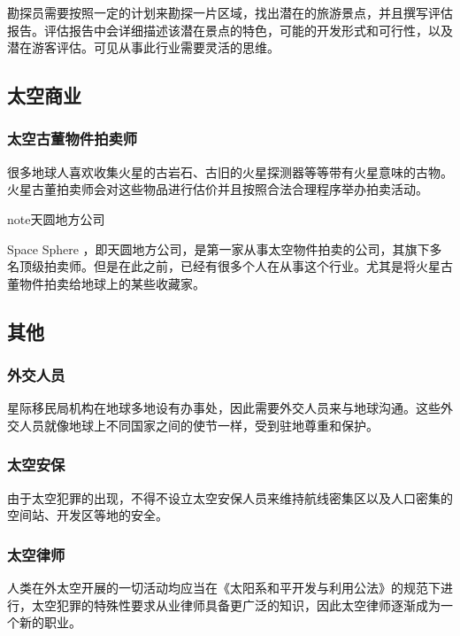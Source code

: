 \documentclass[letterpaper,10pt]{sphinxmanual}
\begin{document}
勘探员需要按照一定的计划来勘探一片区域，找出潜在的旅游景点，并且撰写评估报告。评估报告中会详细描述该潜在景点的特色，可能的开发形式和可行性，以及潜在游客评估。可见从事此行业需要灵活的思维。


\subsection{太空商业}
\label{profession:id39}

\subsubsection{太空古董物件拍卖师}
\label{profession:id40}
很多地球人喜欢收集火星的古岩石、古旧的火星探测器等等带有火星意味的古物。火星古董拍卖师会对这些物品进行估价并且按照合法合理程序举办拍卖活动。

\begin{notice}{note}{天圆地方公司}

Space Sphere ，即天圆地方公司，是第一家从事太空物件拍卖的公司，其旗下多名顶级拍卖师。但是在此之前，已经有很多个人在从事这个行业。尤其是将火星古董物件拍卖给地球上的某些收藏家。
\end{notice}


\subsection{其他}
\label{profession:id41}

\subsubsection{外交人员}
\label{profession:id42}
星际移民局机构在地球多地设有办事处，因此需要外交人员来与地球沟通。这些外交人员就像地球上不同国家之间的使节一样，受到驻地尊重和保护。


\subsubsection{太空安保}
\label{profession:id43}
由于太空犯罪的出现，不得不设立太空安保人员来维持航线密集区以及人口密集的空间站、开发区等地的安全。


\subsubsection{太空律师}
\label{profession:id44}
人类在外太空开展的一切活动均应当在《太阳系和平开发与利用公法》的规范下进行，太空犯罪的特殊性要求从业律师具备更广泛的知识，因此太空律师逐渐成为一个新的职业。
\end{document}
